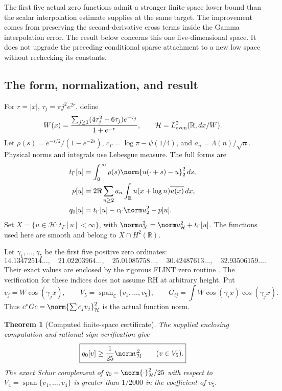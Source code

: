 \documentclass[11pt,a4paper]{article}
\numberwithin{equation}{section}
\newtheorem{theorem}{Theorem}[section]
\theoremstyle{definition}\newtheorem{definition}[theorem]{Definition}
\theoremstyle{remark}\newtheorem{remark}[theorem]{Remark}
\newcommand{\Hh}{\mathcal H}\newcommand{\Hw}{\mathcal H}
\begin{document}
The first five actual zero functions admit a stronger finite-space lower
bound than the scalar interpolation estimate supplies at the same target.
The improvement comes from preserving the second-derivative cross terms
inside the Gamma interpolation error. The result below concerns this one
five-dimensional space. It does not upgrade the preceding conditional
sparse attachment to a new low space without rechecking its constants.

\subsection{The form, normalization, and result}
For $r=|x|$, $\tau_j=\pi j^2e^{2r}$, define
\[
 W(x)=\frac{\sum_{j\ge1}(4\tau_j^2-6\tau_j)e^{-\tau_j}}{1+e^{-r}},
 \qquad \Hh=L^2_{\rm even}(\mathbb R,dx/W).
\]
Let $\rho(s)=e^{-s/2}/(1-e^{-2s})$, $c_\Gamma=\log\pi-\psi(1/4)$,
and $a_n=\Lambda(n)/\sqrt n$. Physical norms and integrals use Lebesgue
measure. The full forms are
\begin{align}
 t_\Gamma[u]&=\int_0^\infty\rho(s)\norm{u(\cdot+s)-u}_2^2\,ds,\\
 p[u]&=2\Re\sum_{n\ge2}a_n\int_{\mathbb R}u(x+\log n)\overline{u(x)}\,dx,\\
 q_0[u]&=t_\Gamma[u]-c_\Gamma\norm u_2^2-p[u].\label{fz5:eq:q}
\end{align}
Set $X=\{u\in\Hh:t_\Gamma[u]<\infty\}$, with
$\norm u_X^2=\norm u_\Hh^2+t_\Gamma[u]$.
The functions used here are smooth and belong to $X\cap H^2(\mathbb R)$.

Let $\gamma_1,\ldots,\gamma_5$ be the first five positive zero ordinates:
\[
14.13472514\ldots,\quad21.02203964\ldots,\quad25.01085758\ldots,
\quad30.42487613\ldots,\quad32.93506159\ldots.
\]
Their exact values are enclosed by the rigorous FLINT zero routine
\cite{fzFlintZeros}. The verification for these indices does not assume
RH at arbitrary height. Put
\[
 v_j=W\cos(\gamma_jx),\qquad V_5=\operatorname{span}_{\mathbb C}\{v_1,\ldots,v_5\},
 \qquad G_{ij}=\int W\cos(\gamma_ix)\cos(\gamma_jx).
\]
Thus $c^*Gc=\norm{\sum c_jv_j}_\Hh^2$ is the actual function norm.

\begin{theorem}[Computed finite-space certificate]\label{fz5:thm:main}
The supplied enclosing computation and rational sign verification give
\begin{equation}\label{fz5:eq:main}
 \boxed{q_0[v]\ge\frac1{25}\norm v_\Hh^2\qquad(v\in V_5).}
\end{equation}
The exact Schur complement of $q_0-\norm{\cdot}_\Hh^2/25$ with respect to
$V_4=\operatorname{span}\{v_1,\ldots,v_4\}$ is greater than $1/2000$
in the coefficient of $v_5$.
\end{theorem}
\end{document}
